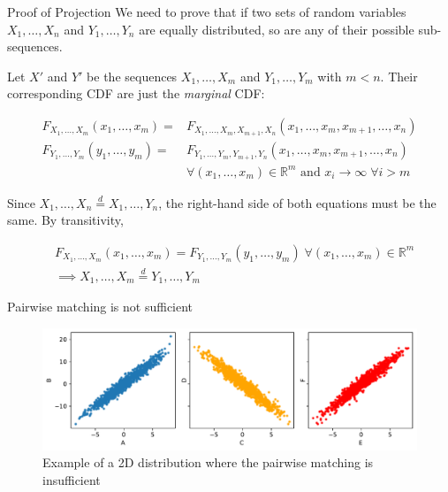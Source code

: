 \documentclass[10pt]{beamer}
\newcommand{\eqdist}{\stackrel{d}{=}}
\begin{document}
\begin{frame}{Proof of Projection}
\small
We need to prove that if two sets of random variables
$X_1,\dots,X_n$ and $Y_1,\dots,Y_n$ are equally distributed, so are
any of their possible sub-sequences.

Let $X'$ and $Y'$ be the sequences $X_1,\dots,X_m$ and $Y_1,\dots,Y_m$ with $m < n$.
Their corresponding  CDF are just the \emph{marginal} CDF:

\begin{equation}
\begin{split}
    F_{X_1,\dots,X_m}(x_1,\dots,x_m) = & F_{X_1,\dots,X_m,X_{m+1},X_n}(x_1,\dots,x_m,x_{m+1},\dots,x_n) \\
    F_{Y_1,\dots,Y_m}(y_1,\dots,y_m) =& F_{Y_1,\dots,Y_m,Y_{m+1},Y_n}(x_1,\dots,x_m,x_{m+1},\dots,x_n)\\
    & \forall (x_1,\dots,x_m) \in \mathbb{R}^m \textrm{ and } x_i \xrightarrow{} \infty \; \forall i > m
\end{split}
\end{equation}

Since $X_1,\ldots,X_n \eqdist X_1,\ldots,Y_n$, the right-hand side of both equations must be the same.
By transitivity, 

\begin{equation}
\begin{split}
    & F_{X_1,\dots,X_m}(x_1,\dots,x_m) = F_{Y_1,\dots,Y_m}(y_1,\dots,y_m) \; \forall (x_1,\dots,x_m) \in \mathbb{R}^m \\
    & \implies X_1,\dots,X_m \eqdist Y_1,\dots,Y_m
\end{split}
\end{equation}


\end{frame}

\begin{frame}{Pairwise matching is not sufficient}
\begin{figure}
    \centering
    \includegraphics[width=\textwidth]{no2ind.pdf}
    \caption{Example of a 2D distribution where the pairwise matching is insufficient}
\end{figure}
\end{frame}
\end{document}
